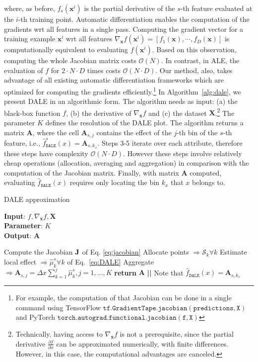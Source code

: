 \documentclass[wcp]{jmlr}
\newcommand{\dale}{\hat{f}_{\mathtt{DALE}}}
\newcommand{\xb}{\mathbf{x}} \newcommand{\R}{\mathbb{R}}
\begin{document}
\noindent
where, as before, \( f_s(\xb^i) \) is the partial derivative of the
\(s\)-th feature evaluated at the \(i\)-th training point. Automatic
differentiation enables the computation of the gradients wrt all
features in a single pass. Computing the gradient vector for a
training example \(\xb^i\) wrt all features
\( \nabla_{\xb}f(\xb^i) = [f_1(\xb), \cdots, f_D(\xb)] \) is
computationally equivalent to evaluating \(f(\xb^i)\). Based on this
observation, computing the whole Jacobian matrix costs
\(\mathcal{O}(N)\). In contrast, in ALE, the evaluation of \(f\) for
\(2 \cdot N \cdot D\) times costs \(\mathcal{O}(N \cdot D)\). Our
method, also, takes advantage of all existing automatic
differentiation frameworks which are optimized for computing the
gradients efficiently.\footnote{For example, the computation of that
  Jacobian can be done in a single command using TensorFlow
  \( \mathtt{tf.GradientTape.jacobian(predictions, X)} \) and PyTorch
  \( \mathtt{torch.autograd.functional.jacobian(f, X)} \)} In
Algorithm~\ref{alg:dale}, we present DALE in an algorithmic form. The
algorithm needs as input: (a) the black-box function \(f\), (b) the
derivative of \(\nabla_{\mathbf{x}} f \) and (c) the dataset
\( \mathbf{X} \).\footnote{Technically, having access to
  \(\nabla_{\mathbf{x}} f \) is not a prerequisite, since the partial
  derivative \(\frac{\partial f}{\partial x}\) can be approximated
  numerically, with finite differences. However, in this case, the
  computational advantages are canceled.} The parameter \( K \)
defines the resolution of the DALE plot. The algorithm returns a
matrix \(\mathbf{A}\), where the cell \(\mathbf{A}_{s,j}\) contains
the effect of the \(j\)-th bin of the \(s\)-th feature, i.e.,
\(\dale^s(x) = \mathbf{A}_{s,k_x} \). Steps 3-5 iterate
over each attribute, therefore these steps have complexity
\(\mathcal{O}(N \cdot D)\). However these steps involve relatively
cheap operations (allocation, averaging and aggregation) in comparison
with the computation of the Jacobian matrix. Finally, with matrix
\(\mathbf{A}\) computed, evaluating \(\dale(x)\) requires
only locating the bin \(k_x\) that \( x \) belongs to.

\begin{algorithm}[h]
\caption{DALE approximation}
\label{alg:dale}
\textbf{Input}: \( f, \nabla_{\mathbf{x}} f, \mathbf{X} \) \\
\textbf{Parameter}: \( K \) \\
\textbf{Output}: \(\mathbf{A}\)
\begin{algorithmic}[1] %
\STATE Compute the Jacobian \(\mathbf{J}\) of Eq. \eqref{eq:jacobian}
\STATE Allocate points \( \Rightarrow \mathcal{S}_k \forall k \)
\STATE Estimate local effect \( \Rightarrow \hat{\mu}_k^s \forall k\) of Eq.~\eqref{eq:DALE}
\STATE Aggregate \( \Rightarrow \mathbf{A}_{s,j} = \Delta x\sum_{k=1}^{j} \hat{\mu}_k^s, j =  1, \ldots, K \)
\ENDFOR
\STATE \textbf{return} \(\mathbf{A}\) \textbf{||} Note that \( \dale(x) = \mathbf{A}_{s,k_x} \)
\end{algorithmic}
\end{algorithm}
\end{document}
